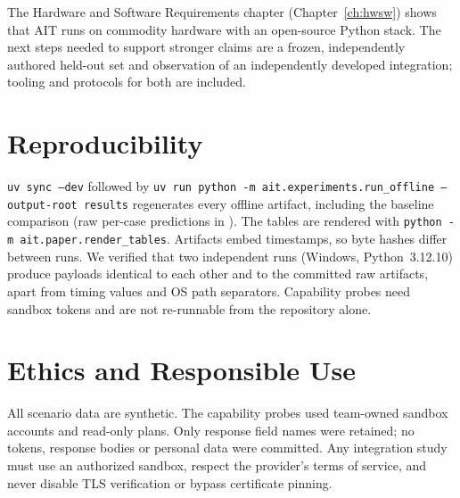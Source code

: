 \documentclass[12pt,a4paper]{report}
\begin{document}
The Hardware and Software Requirements chapter (Chapter~\ref{ch:hwsw}) shows that AIT runs on
commodity hardware with an open-source Python stack. The next steps needed to support stronger
claims are a frozen, independently authored held-out set and observation of an independently
developed integration; tooling and protocols for both are included.

\section*{Reproducibility}
\label{sec:repro}

\texttt{uv sync --dev} followed by
\texttt{uv run python -m ait.experiments.run\_offline --output-root results} regenerates every
offline artifact, including the baseline comparison (raw per-case predictions in
). The tables are rendered with
\texttt{python -m ait.paper.render\_tables}. Artifacts embed timestamps, so byte hashes differ
between runs. We verified that two independent runs (Windows, Python~3.12.10) produce payloads
identical to each other and to the committed raw artifacts, apart from timing values and OS path
separators. Capability probes need sandbox tokens and are not re-runnable from the repository
alone.

\section*{Ethics and Responsible Use}

All scenario data are synthetic. The capability probes used team-owned sandbox accounts and
read-only plans. Only response field names were retained; no tokens, response bodies or personal
data were committed. Any integration study must use an authorized sandbox, respect the provider's
terms of service, and never disable TLS verification or bypass certificate pinning.

\end{document}
